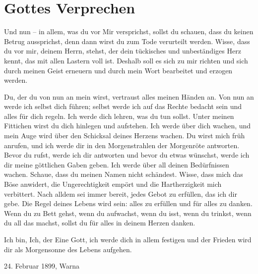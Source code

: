 \raggedbottom

\chapter{Gottes Verprechen}


Und nun -- in allem, was du vor Mir versprichst, sollst du schauen, dass du keinen Betrug aussprichst, denn dann wirst du zum Tode verurteilt werden. Wisse, dass du vor mir, deinem Herrn, stehst, der dein tückisches und unbeständiges Herz kennt, das mit allen Lastern voll ist. Deshalb soll es sich zu mir richten und sich durch meinen Geist erneuern und durch mein Wort bearbeitet und erzogen werden. 

Du, der du von nun an mein wirst, vertraust alles meinen Händen an. Von nun an werde ich selbst dich führen; selbst werde ich auf das Rechte bedacht sein und alles für dich regeln. Ich werde dich lehren, was du tun sollst. Unter meinen Fittichen wirst du dich hinlegen und aufstehen. Ich werde über dich wachen, und mein Auge wird über den Schicksal deines Herzens wachen. Du wirst mich früh anrufen, und ich werde dir in den Morgenstrahlen der Morgenröte antworten. Bevor du rufst, werde ich dir antworten und bevor du etwas wünschst, werde ich dir meine göttlichen Gaben geben. Ich werde über all deinen Bedürfnissen wachen. Schaue, dass du meinen Namen nicht schändest. Wisse, dass mich das Böse anwidert, die Ungerechtigkeit empört und die Hartherzigkeit mich verbittert. Nach alldem sei immer bereit, jedes Gebot zu erfüllen, das ich dir gebe. Die Regel deines Lebens wird sein: alles zu erfüllen und für alles zu danken. Wenn du zu Bett gehst, wenn du aufwachst, wenn du isst, wenn du trinkst, wenn du all das machst, sollst du für alles in deinem Herzen danken. 

Ich bin, Ich, der Eine Gott, ich werde dich in allem festigen und der Frieden wird dir als Morgensonne des Lebens aufgehen.

24. Februar 1899, Warna